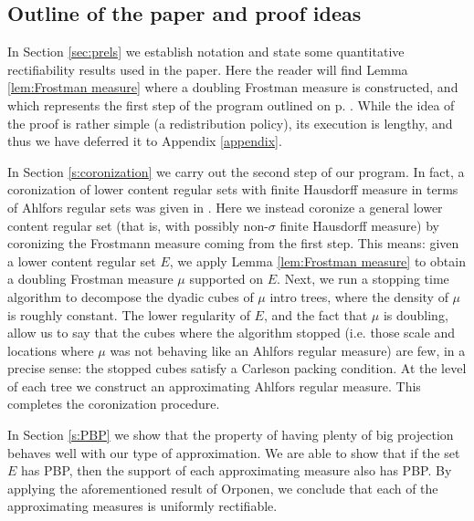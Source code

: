 \documentclass[11pt,reqno]{amsart}
\theoremstyle{definition}
\theoremstyle{remark}
\numberwithin{equation}{section}
\theoremstyle{theorem}
\theoremstyle{definition}
\theoremstyle{remark}
\numberwithin{equation}{section}
\begin{document}
	
	\subsection{Outline of the paper and proof ideas} In Section \ref{sec:prels} we establish notation and state some quantitative rectifiability results used in the paper. Here the reader will find Lemma \ref{lem:Frostman measure} where a doubling Frostman measure is constructed, and which represents the first step of the program outlined on p. \pageref{program}. While the idea of the proof is rather simple (a redistribution policy), its execution is lengthy, and thus we have deferred it to Appendix \ref{appendix}.

  In Section \ref{s:coronization} we carry out the second step of our program. In fact, a coronization of lower content regular sets with finite Hausdorff measure in terms of Ahlfors regular sets was given in \cite{azzam2019quantitative}. Here we instead coronize a general lower content regular set (that is, with possibly non-$\sigma$ finite Hausdorff measure) by coronizing the Frostmann measure coming from the first step. This means: given a lower content regular set $E$, we apply Lemma \ref{lem:Frostman measure} to obtain a doubling Frostman measure $\mu$ supported on $E$. Next, we run a stopping time algorithm to decompose the dyadic cubes of $\mu$ intro trees, where the density of $\mu$ is roughly constant. The lower regularity of $E$, and the fact that $\mu$ is doubling, allow us to say that the cubes where the algorithm stopped (i.e. those scale and locations where $\mu$ was not behaving like an Ahlfors regular measure) are few, in a precise sense: the stopped cubes satisfy a Carleson packing condition. At the level of each tree we construct an approximating Ahlfors regular measure. This completes the coronization procedure. 

  In Section \ref{s:PBP} we show that the property of having plenty of big projection behaves well with our type of approximation. We are able to show that if the set $E$ has PBP, then the support of each approximating measure also has PBP. By applying the aforementioned result of Orponen, we conclude that each of the approximating measures is uniformly rectifiable.
 
\end{document}
